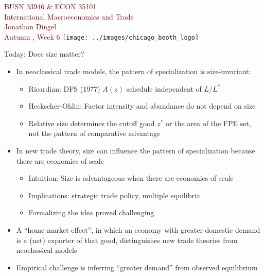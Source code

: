 \documentclass[10pt,notes=hide]{beamer}
\begin{document}
\begin{frame}[plain]
\begin{center}
\large
\textcolor{maroon}{BUSN 33946 \& ECON 35101\\
International Macroeconomics and Trade\\ 
Jonathan Dingel\\
Autumn \the\year, Week 6}
\vfill 
\texttt{[image: ../images/chicago\_booth\_logo]}
\end{center}
\end{frame}
\begin{frame}{Today: Does size matter?}
\linespread{1.1}
\begin{itemize}
	\item In neoclassical trade models, the pattern of specialization is size-invariant:
	\begin{itemize}
		\item Ricardian: DFS (1977) $A(z)$ schedule independent of $L/L^{*}$
		\item Heckscher-Ohlin: Factor intensity and abundance do not depend on size 
		\item Relative size determines the cutoff good $z^{*}$ or the area of the FPE set, not the pattern of comparative advantage
	\end{itemize}
	\item In new trade theory, size can influence the pattern of specialization because there are economies of scale
\begin{itemize}
	\item Intuition: Size is advantageous when there are economies of scale
	\item Implications: strategic trade policy, multiple equilibria
	\item Formalizing the idea proved challenging
\end{itemize}
	\item A ``home-market effect'', in which an economy with greater domestic demand is a (net) exporter of that good, distinguishes new trade theories from neoclassical models
	\item Empirical challenge is inferring ``greater demand'' from observed equilibrium
\end{itemize}
\end{frame}
\end{document}
